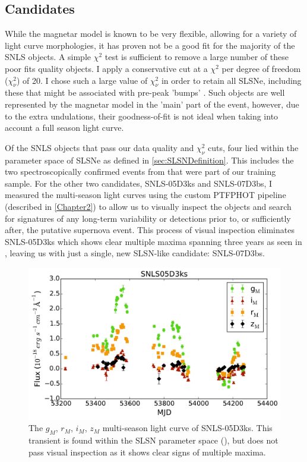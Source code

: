 \subsection{Candidates}
\label{sec:SLSNCands}
While the magnetar model is known to be very flexible, allowing for a variety of light curve morphologies, it has proven not be a good fit for the majority of the SNLS objects. A simple $\chi^2$ test is sufficient to remove a large number of these poor fits quality objects. I apply a conservative cut at a $\chi^2$ per degree of freedom ($\chi^2_{\nu}$) of 20. I chose such a large value of $\chi^2_{\nu}$ in order to retain all SLSNe, including these that might be associated with pre-peak 'bumps' \citep{Nicoll2016,Nicoll2015a,Smith2016}. Such objects are well represented by the magnetar model in the 'main' part of the event, however, due to the extra undulations, their goodness-of-fit is not ideal when taking into account a full season light curve.

Of the SNLS objects that pass our data quality and $\chi^2_{\nu}$ cuts, four lied within the parameter space of SLSNe as defined in \ref{sec:SLSNDefinition}. This includes the two spectroscopically confirmed events from \citet{Howell2013} that were part of our training sample. For the other two candidates, SNLS-05D3ks and SNLS-07D3bs, I  measured the multi-season light curves using the custom \textsc{PTFPHOT} pipeline (described in \cref{Chapter2}) to allow us to visually inspect the objects and search for signatures of any long-term variability or detections prior to, or sufficiently after, the putative supernova event. This process of visual inspection eliminates SNLS-05D3ks which shows clear multiple maxima spanning three years as seen in , leaving us with just a single, new SLSN-like candidate: SNLS-07D3bs.

\begin{figure}
\centering
\includegraphics[width=\textwidth]{Figures/Chapter3/SNLS05D3ks}
\caption{The $g_M$, $r_M$, $i_M$, $z_M$ multi-season light curve of SNLS-05D3ks. This transient is found within the SLSN parameter space (), but does not pass visual inspection as it shows clear signs of multiple maxima.}
\label{fig:05D3ks}
\end{figure}

